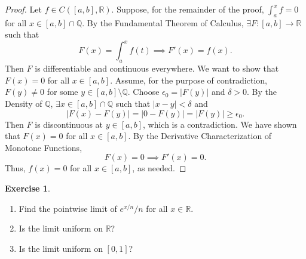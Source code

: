 \documentclass[12pt]{article}
\theoremstyle{definition}
\newtheorem{exercise}{Exercise}
\begin{document}
\begin{proof}
    Let \(f \in C([a, b], \mathbb{R})\). Suppose, for the remainder of the proof, \(\int_{a}^{x} f = 0\) for all \(x \in [a, b] \cap \mathbb{Q}\). By the Fundamental Theorem of Calculus, \(\exists F : [a, b] \to \mathbb{R}\) such that
    \[
        F(x) = \int_{a}^{x} f(t) \implies F'(x) = f(x).
    \]
    Then \(F\) is differentiable and continuous everywhere. We want to show that \(F(x) = 0\) for all \(x \in [a, b]\). Assume, for the purpose of contradiction, \(F(y) \neq 0\) for some \(y \in [a, b] \setminus \mathbb{Q}\). Choose \(\epsilon_0 = \vert F(y) \vert\) and \(\delta > 0\). By the Density of \(\mathbb{Q}\), \(\exists x \in [a, b] \cap \mathbb{Q}\) such that \(\vert x - y \vert < \delta\) and 
    \[
        \vert F(x) - F(y) \vert = \vert 0 - F(y) \vert = \vert F(y) \vert \geq \epsilon_0.
    \]
    Then \(F\) is discontinuous at \(y \in [a, b]\), which is a contradiction. We have shown that \(F(x) = 0\) for all \(x \in [a, b]\). By the Derivative Characterization of Monotone Functions,
    \[
        F(x) = 0 \implies F'(x) = 0.
    \]
    Thus, \(f(x) = 0\) for all \(x \in [a, b]\), as needed.
\end{proof}

\begin{exercise}
    \hfill
    \begin{enumerate}[label=(\alph*)]
        \item Find the pointwise limit of \(e^{x /n} / n\) for all \(x \in \mathbb{R}\).
        \item Is the limit uniform on \(\mathbb{R}\)?
        \item Is the limit uniform on \([0, 1]\)?
    \end{enumerate}
\end{exercise}
\end{document}
